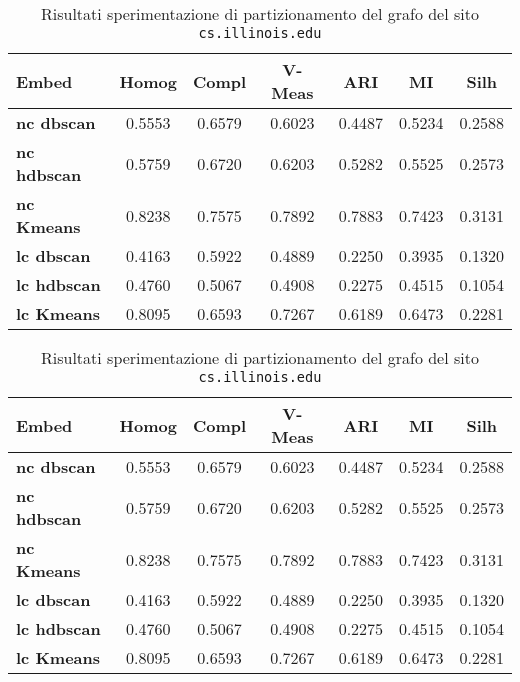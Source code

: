 \begin{table}[H]
	\begin{tabular}{| l | c | c | c | c | c | c |}
	\hline
	\textbf{Embed}  & \textbf{Homog} & \textbf{Compl} & \textbf{V-Meas}  & \textbf{ARI}  & \textbf{MI}  & \textbf{Silh} \\ [3ex] \hline
	\textbf{nc dbscan} & 0.5553 & 0.6579 & 0.6023 & 0.4487 & 0.5234 & 0.2588\\ [3ex]
	 \hline 
	\textbf{nc hdbscan} & 0.5759 & 0.6720 & 0.6203 & 0.5282 & 0.5525 & 0.2573\\ [3ex]
	 \hline
	\textbf{nc Kmeans} & 0.8238 & 0.7575 & 0.7892 & 0.7883 & 0.7423 & 0.3131\\ [3ex]
	 \hline	
	\textbf{lc dbscan} & 0.4163 & 0.5922 & 0.4889 & 0.2250 & 0.3935 & 0.1320\\ [3ex]
	\hline
	\textbf{lc hdbscan} & 0.4760 & 0.5067 & 0.4908 & 0.2275 & 0.4515 & 0.1054\\ [3ex]
	\hline
	
	\textbf{lc Kmeans} & 0.8095 & 0.6593 & 0.7267 & 0.6189 & 0.6473 & 0.2281\\ [3ex]
	\hline
	\end{tabular}
	\caption{Risultati sperimentazione di partizionamento del grafo del sito \texttt{cs.illinois.edu}}
	\label{metricheEmbed}
\end{table}


\begin{table}[H]
	\begin{tabular}{| l | c | c | c | c | c | c |}
	\hline
	\textbf{Embed}  & \textbf{Homog} & \textbf{Compl} & \textbf{V-Meas}  & \textbf{ARI}  & \textbf{MI}  & \textbf{Silh} \\ [3ex] \hline
	\textbf{nc dbscan} & 0.5553 & 0.6579 & 0.6023 & 0.4487 & 0.5234 & 0.2588\\ [3ex]
	 \hline 
	\textbf{nc hdbscan} & 0.5759 & 0.6720 & 0.6203 & 0.5282 & 0.5525 & 0.2573\\ [3ex]
	 \hline
	\textbf{nc Kmeans} & 0.8238 & 0.7575 & 0.7892 & 0.7883 & 0.7423 & 0.3131\\ [3ex]
	 \hline	
	\textbf{lc dbscan} & 0.4163 & 0.5922 & 0.4889 & 0.2250 & 0.3935 & 0.1320\\ [3ex]
	\hline
	\textbf{lc hdbscan} & 0.4760 & 0.5067 & 0.4908 & 0.2275 & 0.4515 & 0.1054\\ [3ex]
	\hline
	
	\textbf{lc Kmeans} & 0.8095 & 0.6593 & 0.7267 & 0.6189 & 0.6473 & 0.2281\\ [3ex]
	\hline
	\end{tabular}
	\caption{Risultati sperimentazione di partizionamento del grafo del sito \texttt{cs.illinois.edu}}
	\label{metricheEmbed}
\end{table}

